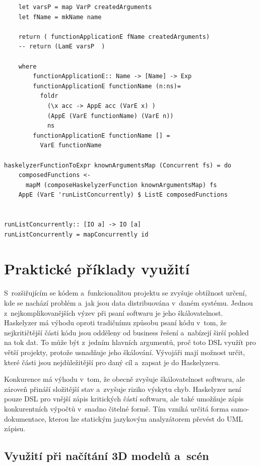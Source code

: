 \documentclass[male, czech]{kithesis}
\newenvironment{code}{\captionsetup{type=listing}}{}
\begin{document}
\begin{code}
\begin{verbatim}
    let varsP = map VarP createdArguments 
    let fName = mkName name

    return ( functionApplicationE fName createdArguments)
    -- return (LamE varsP  )

    where
        functionApplicationE:: Name -> [Name] -> Exp
        functionApplicationE functionName (n:ns)= 
          foldr 
            (\x acc -> AppE acc (VarE x) ) 
            (AppE (VarE functionName) (VarE n)) 
            ns
        functionApplicationE functionName [] = 
          VarE functionName

haskelyzerFunctionToExpr knownArgumentsMap (Concurrent fs) = do
    composedFunctions <- 
      mapM (composeHaskelyzerFunction knownArgumentsMap) fs
    AppE (VarE 'runListConcurrently) $ ListE composedFunctions


runListConcurrently:: [IO a] -> IO [a]
runListConcurrently = mapConcurrently id

\end{verbatim}
\end{code}

\chapter{Praktické příklady využití}

S~rozšiřujícím se kódem a~funkcionalitou projektu se zvyšuje obtížnost určení, 
kde se nachází problém a~jak jsou data distribuována v~daném systému. 
Jednou z~nejkomplikovanějších výzev při psaní softwaru je jeho škálovatelnost. 
Haskelyzer má výhodu oproti tradičnímu způsobu psaní kódu v~tom, 
že nejkritičtější části kódu jsou odděleny od business řešení a~nabízejí širší pohled na tok dat. 
To může být z~jedním hlavních argumentů, 
proč toto DSL využít pro větší projekty,
protože usnadňuje jeho škálování.
Vývojáři mají možnost určit, které části jsou nejdůležitější pro daný cíl a~zapsat je do Haskelyzeru.

Konkurence má výhodu v~tom, že obecně zvyšuje škálovatelnost softwaru, 
ale zároveň přináší složitější stav a~zvyšuje riziko výskytu chyb. 
Haskelyzer není pouze DSL pro vnější zápis kritických částí softwaru, 
ale také umožňuje zápis konkurentních výpočtů v~snadno čitelné formě. 
Tím vzniká určitá forma samo-dokumentace, 
kterou lze statickým jazykovým analyzátorem převést do UML zápisu.

\section{Využití při načítání 3D modelů a~scén}
\end{document}
